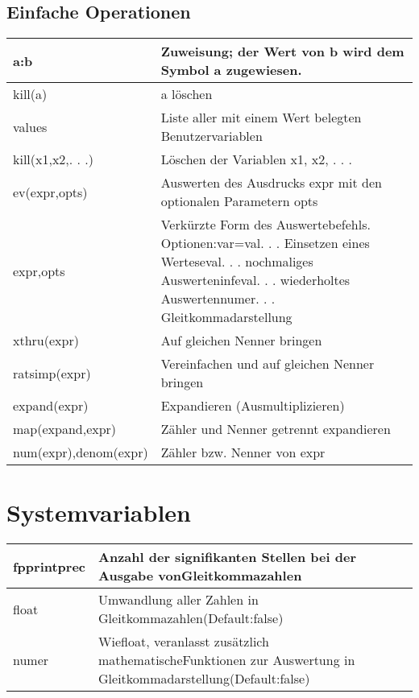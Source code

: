 \documentclass[../main.tex]{subfiles}
\begin{document}
\subsection{Einfache Operationen}
\begin{tabularx}{0.8\textwidth} { 
    >{\centering\arraybackslash}X 
    >{\centering\arraybackslash}X  }
    a:b & Zuweisung; der Wert von b wird dem Symbol a zugewiesen.
    \\ [7pt]
    \hline
    kill(a) & a löschen 
    \\ [7pt]
    \hline
    values & Liste aller mit einem Wert belegten Benutzervariablen
    \\ [7pt]
    \hline
    kill(x1,x2,. . .) & Löschen der Variablen x1, x2, . . .
    \\ [7pt]
    \hline
    ev(expr,opts) & Auswerten des Ausdrucks expr mit den optionalen Parametern opts
    \\ [7pt]
    \hline
    expr,opts & Verkürzte Form des Auswertebefehls. Optionen:var=val. . . Einsetzen eines Werteseval. . . nochmaliges Auswerteninfeval. . . wiederholtes Auswertennumer. . . Gleitkommadarstellung
    \\ [7pt]
    \hline
    xthru(expr) & Auf gleichen Nenner bringen
    \\ [7pt]
    \hline
    ratsimp(expr) & Vereinfachen und auf gleichen Nenner bringen
    \\ [7pt]
    \hline
    expand(expr) & Expandieren (Ausmultiplizieren)
    \\ [7pt]
    \hline
    map(expand,expr) & Zähler und Nenner getrennt expandieren
    \\ [7pt]
    \hline
    num(expr),denom(expr) & Zähler bzw. Nenner von expr
    \\ [7pt]
\end{tabularx}

\section{Systemvariablen}
\begin{tabularx}{0.8\textwidth} { 
    >{\centering\arraybackslash}X 
    >{\centering\arraybackslash}X  }
    fpprintprec & Anzahl der signifikanten Stellen bei der Ausgabe vonGleitkommazahlen
    \\ [7pt]
    \hline
    float & Umwandlung aller Zahlen in Gleitkommazahlen(Default:false)
    \\ [7pt]
    \hline
    numer & Wiefloat, veranlasst zusätzlich mathematischeFunktionen zur Auswertung in Gleitkommadarstellung(Default:false)
    \\ [7pt]
\end{tabularx}
\end{document}
